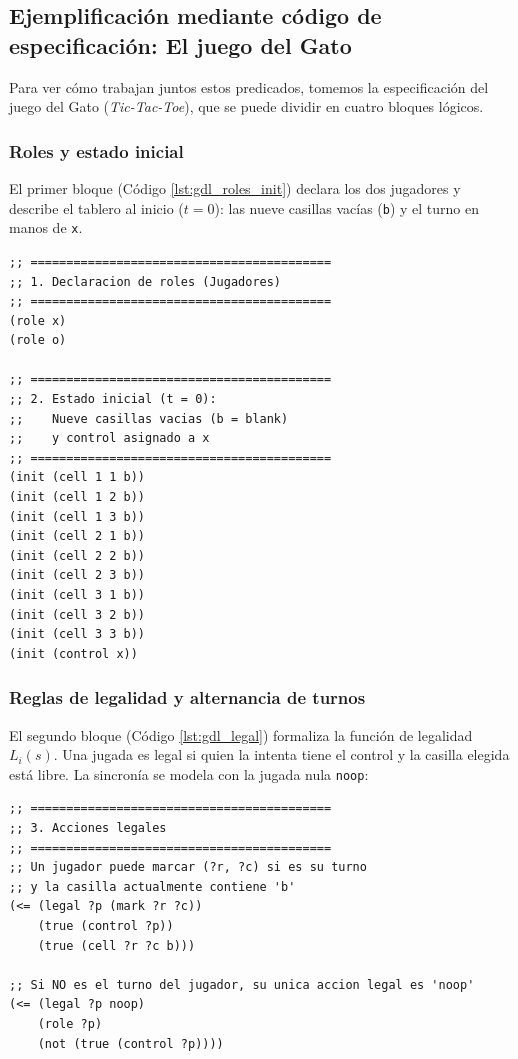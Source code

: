 \subsection{Ejemplificación mediante código de especificación: El juego del Gato}

Para ver cómo trabajan juntos estos predicados, tomemos la especificación del juego del Gato (\textit{Tic-Tac-Toe}), que se puede dividir en cuatro bloques lógicos.

\subsubsection{Roles y estado inicial}

El primer bloque (Código \ref{lst:gdl_roles_init}) declara los dos jugadores y describe el tablero al inicio ($t = 0$): las nueve casillas vacías (\texttt{b}) y el turno en manos de \texttt{x}.

\begin{lstlisting}[caption={Declaración de roles y estado inicial para el juego del Gato.},label={lst:gdl_roles_init}]
;; ==========================================
;; 1. Declaracion de roles (Jugadores)
;; ==========================================
(role x)
(role o)

;; ==========================================
;; 2. Estado inicial (t = 0):
;;    Nueve casillas vacias (b = blank)
;;    y control asignado a x
;; ==========================================
(init (cell 1 1 b))
(init (cell 1 2 b))
(init (cell 1 3 b))
(init (cell 2 1 b))
(init (cell 2 2 b))
(init (cell 2 3 b))
(init (cell 3 1 b))
(init (cell 3 2 b))
(init (cell 3 3 b))
(init (control x))
\end{lstlisting}

\subsubsection{Reglas de legalidad y alternancia de turnos}

El segundo bloque (Código \ref{lst:gdl_legal}) formaliza la función de legalidad $L_i(s)$. Una jugada es legal si quien la intenta tiene el control y la casilla elegida está libre. La sincronía se modela con la jugada nula \texttt{noop}:

\begin{lstlisting}[caption={Reglas de legalidad de movimientos en GDL.},label={lst:gdl_legal}]
;; ==========================================
;; 3. Acciones legales
;; ==========================================
;; Un jugador puede marcar (?r, ?c) si es su turno
;; y la casilla actualmente contiene 'b'
(<= (legal ?p (mark ?r ?c))
    (true (control ?p))
    (true (cell ?r ?c b)))

;; Si NO es el turno del jugador, su unica accion legal es 'noop'
(<= (legal ?p noop)
    (role ?p)
    (not (true (control ?p))))
\end{lstlisting}


